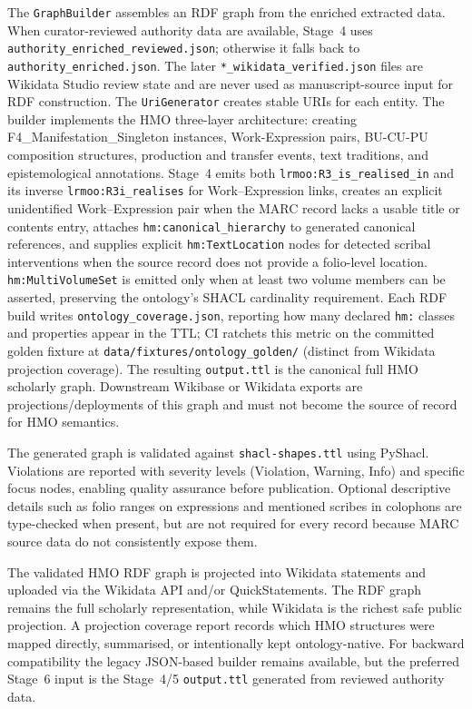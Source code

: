 \documentclass[12pt]{article}
\newcommand{\filepath}[1]{\texttt{\small #1}}
\newcommand{\code}[1]{\texttt{#1}}
\begin{document}
\begin{description}[style=nextline, leftmargin=2cm]
\item[Stage 4: RDF Graph Construction]
  The \code{GraphBuilder} assembles an RDF graph from the enriched extracted data. When curator-reviewed authority data are available, Stage~4 uses \code{authority\_enriched\_reviewed.json}; otherwise it falls back to \code{authority\_enriched.json}. The later \code{*\_wikidata\_verified.json} files are Wikidata Studio review state and are never used as manuscript-source input for RDF construction. The \code{UriGenerator} creates stable URIs for each entity. The builder implements the HMO three-layer architecture: creating F4\_Manifestation\_Singleton instances, Work-Expression pairs, BU-CU-PU composition structures, production and transfer events, text traditions, and epistemological annotations.
  Stage~4 emits both \code{lrmoo:R3\_is\_realised\_in} and its inverse \code{lrmoo:R3i\_realises} for Work--Expression links, creates an explicit unidentified Work--Expression pair when the MARC record lacks a usable title or contents entry, attaches \code{hm:canonical\_hierarchy} to generated canonical references, and supplies explicit \code{hm:TextLocation} nodes for detected scribal interventions when the source record does not provide a folio-level location. \code{hm:MultiVolumeSet} is emitted only when at least two volume members can be asserted, preserving the ontology's SHACL cardinality requirement. Each RDF build writes \filepath{ontology\_coverage.json}, reporting how many declared \code{hm:} classes and properties appear in the TTL; CI ratchets this metric on the committed golden fixture at \filepath{data/fixtures/ontology\_golden/} (distinct from Wikidata projection coverage).
  The resulting \code{output.ttl} is the canonical full HMO scholarly graph. Downstream Wikibase or Wikidata exports are projections/deployments of this graph and must not become the source of record for HMO semantics.

\item[Stage 5: SHACL Validation]
  The generated graph is validated against \code{shacl-shapes.ttl} using PyShacl. Violations are reported with severity levels (Violation, Warning, Info) and specific focus nodes, enabling quality assurance before publication. Optional descriptive details such as folio ranges on expressions and mentioned scribes in colophons are type-checked when present, but are not required for every record because MARC source data do not consistently expose them.

\item[Stage 6: Wikidata Upload]
  The validated HMO RDF graph is projected into Wikidata statements and uploaded via the Wikidata API and/or QuickStatements. The RDF graph remains the full scholarly representation, while Wikidata is the richest safe public projection. A projection coverage report records which HMO structures were mapped directly, summarised, or intentionally kept ontology-native. For backward compatibility the legacy JSON-based builder remains available, but the preferred Stage~6 input is the Stage~4/5 \code{output.ttl} generated from reviewed authority data.


\end{description}
\end{document}
